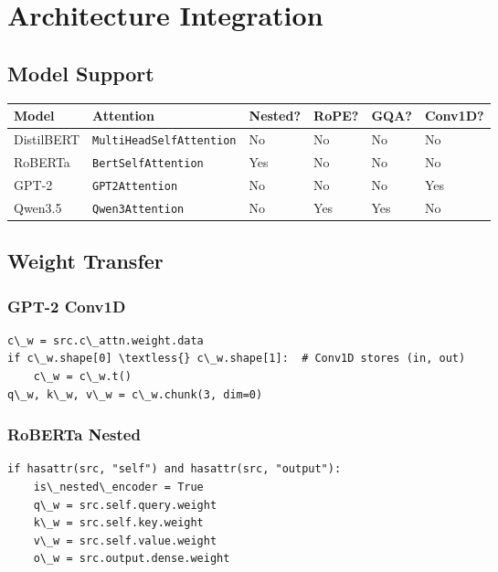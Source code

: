 \section{Architecture Integration}

\subsection{Model Support}

\begin{table}[H]
\centering
\small
\begin{tabular}{llllll}
\toprule
\textbf{Model} & \textbf{Attention} & \textbf{Nested?} & \textbf{RoPE?} & \textbf{GQA?} & \textbf{Conv1D?} \\
\midrule
DistilBERT & \texttt{MultiHeadSelfAttention} & No & No & No & No \\
RoBERTa & \texttt{BertSelfAttention} & Yes & No & No & No \\
GPT-2 & \texttt{GPT2Attention} & No & No & No & Yes \\
Qwen3.5 & \texttt{Qwen3Attention} & No & Yes & Yes & No \\
\bottomrule
\end{tabular}
\end{table}

\subsection{Weight Transfer}

\subsubsection{GPT-2 Conv1D}

\begin{lstlisting}
c\_w = src.c\_attn.weight.data
if c\_w.shape[0] \textless{} c\_w.shape[1]:  # Conv1D stores (in, out)
    c\_w = c\_w.t()
q\_w, k\_w, v\_w = c\_w.chunk(3, dim=0)
\end{lstlisting}

\subsubsection{RoBERTa Nested}

\begin{lstlisting}
if hasattr(src, "self") and hasattr(src, "output"):
    is\_nested\_encoder = True
    q\_w = src.self.query.weight
    k\_w = src.self.key.weight
    v\_w = src.self.value.weight
    o\_w = src.output.dense.weight
\end{lstlisting}

